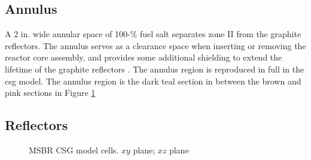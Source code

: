 \subsection{Annulus}
A 2 in. wide annular space of 100-\% fuel salt separates zone II from the
graphite reflectors. The annulus serves as a clearance space when inserting or
removing the reactor core assembly, and provides some additional shielding to
extend the lifetime of the graphite reflectors \cite{robertson_conceptual_1971}. The annulus region is reproduced in full in the \Gls{csg} model. The annulus region is the dark teal section in between the brown and pink sections in Figure \ref{fig:msbr-cells}

\subsection{Reflectors}
\begin{figure}[htpb]
    \centering
    \caption[MSBR CSG model cells]{MSBR CSG model cells.
         $xy$ plane; 
         $xz$ plane} 
    \label{fig:msbr-cells}
\end{figure}
